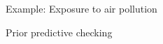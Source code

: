 \documentclass[t]{beamer}
\begin{document}
\begin{frame}

  {\Large\color{navyblue} Example: Exposure to air pollution}

  Prior predictive checking

  \begin{center}
\end{center}
\end{frame}
\end{document}

